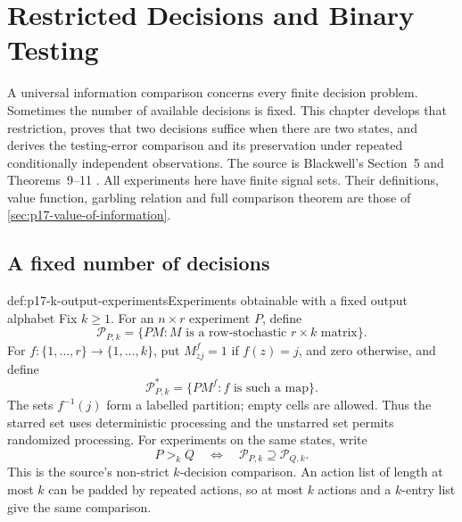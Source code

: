 \chapter{Restricted Decisions and Binary Testing}
\label{sec:p17-restricted-decisions-binary-testing}

A universal information comparison concerns every finite decision problem.
Sometimes the number of available decisions is fixed. This chapter develops
that restriction, proves that two decisions suffice when there are two
states, and derives the testing-error comparison and its preservation under
repeated conditionally independent observations.
The source is Blackwell's Section~5 and Theorems~9--11
\cite[pp.~269--272]{Blackwell1953EquivalentExperiments}.
All experiments here have finite signal sets. Their definitions, value
function, garbling relation and full comparison theorem are those of
\cref{sec:p17-value-of-information}.

\section{A fixed number of decisions}
\label{sec:p17-k-decision-comparison}

\begin{hbdefinition}{def:p17-k-output-experiments}{Experiments obtainable with a fixed output alphabet}
Fix \(k\geq1\). For an \(n\times r\) experiment \(P\), define
\[
 \mathcal P_{P,k}
   =\{PM:M\text{ is a row-stochastic }r\times k\text{ matrix}\}.
\]
For \(f:\{1,\ldots,r\}\to\{1,\ldots,k\}\), put \(M^f_{zj}=1\)
if \(f(z)=j\), and zero otherwise, and define
\[
                 \mathcal P^*_{P,k}=\{PM^f:f\text{ is such a map}\}.
\]
The sets \(f^{-1}(j)\) form a labelled partition; empty cells are allowed.
Thus the starred set uses deterministic processing and the unstarred set
permits randomized processing. For experiments on the same states, write
\[
              P>_kQ\quad\Longleftrightarrow\quad
                    \mathcal P_{P,k}\supseteq\mathcal P_{Q,k}.
\]
This is the source's non-strict \(k\)-decision comparison.
An action list of length at most \(k\) can be padded by repeated actions,
so at most \(k\) actions and a \(k\)-entry list give the same comparison.
\end{hbdefinition}

